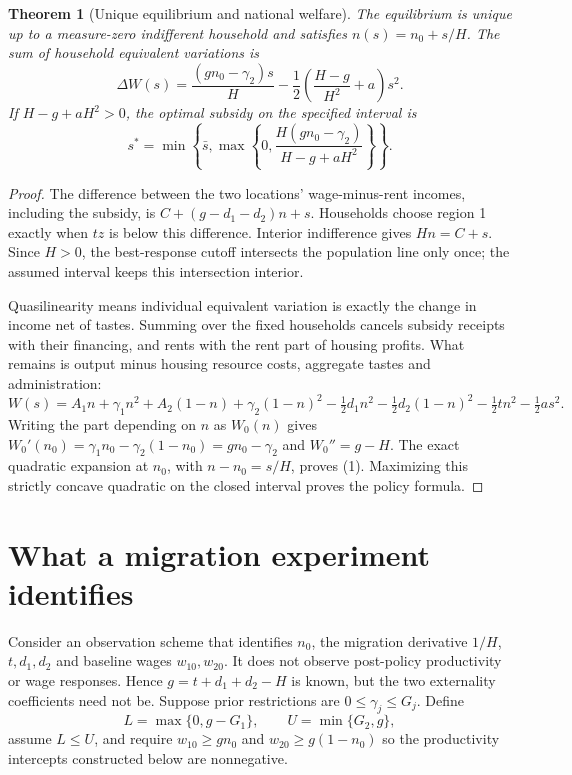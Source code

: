 \documentclass[11pt,a4paper]{article}
\newtheorem{theorem}{Theorem}[section]
\theoremstyle{definition}
\theoremstyle{remark}
\begin{document}
\begin{theorem}[Unique equilibrium and national welfare]
The equilibrium is unique up to a measure-zero indifferent household and satisfies $n(s)=n_0+s/H$. The sum of household equivalent variations is
\[
 \Delta W(s)=\frac{(g n_0-\gamma_2)s}{H}
 -\frac12\left(\frac{H-g}{H^2}+a\right)s^2.\tag{1}
\]
If $H-g+aH^2>0$, the optimal subsidy on the specified interval is
\[
 s^*=\min\!\left\{\bar s,\max\!\left\{0,
 \frac{H(g n_0-\gamma_2)}{H-g+aH^2}\right\}\right\}.
\]
\end{theorem}
\begin{proof}
The difference between the two locations' wage-minus-rent incomes, including the subsidy, is $C+(g-d_1-d_2)n+s$. Households choose region 1 exactly when $tz$ is below this difference. Interior indifference gives $Hn=C+s$. Since $H>0$, the best-response cutoff intersects the population line only once; the assumed interval keeps this intersection interior.

Quasilinearity means individual equivalent variation is exactly the change in income net of tastes. Summing over the fixed households cancels subsidy receipts with their financing, and rents with the rent part of housing profits. What remains is output minus housing resource costs, aggregate tastes and administration:
\[
 W(s)=A_1n+\gamma_1n^2+A_2(1-n)+\gamma_2(1-n)^2
 -\tfrac12d_1n^2-\tfrac12d_2(1-n)^2-\tfrac12tn^2-\tfrac12as^2.
\]
Writing the part depending on $n$ as $W_0(n)$ gives $W_0'(n_0)=\gamma_1n_0-\gamma_2(1-n_0)=g n_0-\gamma_2$ and $W_0''=g-H$. The exact quadratic expansion at $n_0$, with $n-n_0=s/H$, proves (1). Maximizing this strictly concave quadratic on the closed interval proves the policy formula.
\end{proof}

\section{What a migration experiment identifies}
Consider an observation scheme that identifies $n_0$, the migration derivative $1/H$, $t,d_1,d_2$ and baseline wages $w_{10},w_{20}$. It does not observe post-policy productivity or wage responses. Hence $g=t+d_1+d_2-H$ is known, but the two externality coefficients need not be. Suppose prior restrictions are $0\leq\gamma_j\leq G_j$. Define
\[
 L=\max\{0,g-G_1\},\qquad U=\min\{G_2,g\},
\]
assume $L\leq U$, and require $w_{10}\geq gn_0$ and $w_{20}\geq g(1-n_0)$ so the productivity intercepts constructed below are nonnegative.
\end{document}
